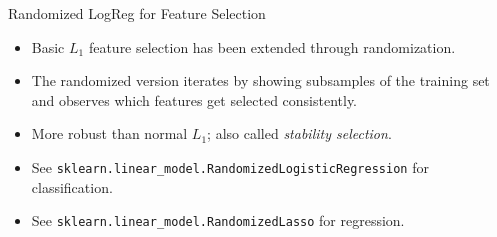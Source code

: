 \documentclass[10pt, aspectratio=169]{beamer} %
\begin{document}
\begin{frame}[fragile]{Randomized LogReg for Feature Selection}
\begin{itemize}
\item Basic $L_1$ feature selection has been extended through randomization.
\item The randomized version iterates by showing subsamples of the training set and observes
which features get selected consistently.
\item More robust than normal $L_1$; also called \emph{stability selection}.
\item See \verb+sklearn.linear_model.RandomizedLogisticRegression+ for classification.
\item See \verb+sklearn.linear_model.RandomizedLasso+ for regression.
\end{itemize}
\end{frame}
\end{document}
